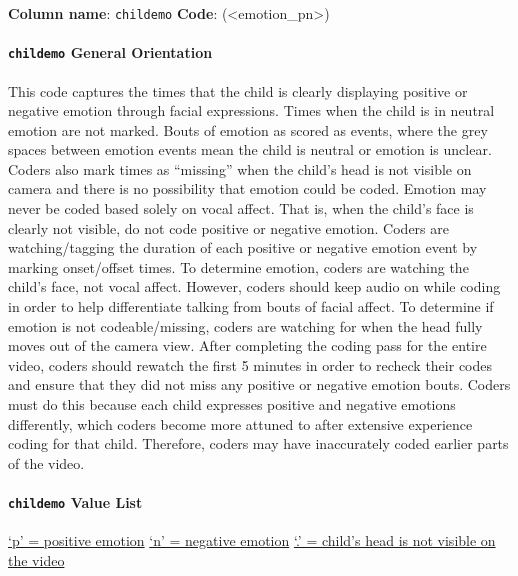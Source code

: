\documentclass[
]{book}
\begin{document}
\textbf{Column name}: \texttt{childemo}
\textbf{Code}: (\textless emotion\_pn\textgreater)

\hypertarget{childemo-general-orientation}{%
\paragraph*{\texorpdfstring{\texttt{childemo} General Orientation}{childemo General Orientation}}\label{childemo-general-orientation}}

This code captures the times that the child is clearly displaying positive or negative emotion through facial expressions. Times when the child is in neutral emotion are not marked. Bouts of emotion as scored as events, where the grey spaces between emotion events mean the child is neutral or emotion is unclear. Coders also mark times as ``missing'' when the child's head is not visible on camera and there is no possibility that emotion could be coded. Emotion may never be coded based solely on vocal affect. That is, when the child's face is clearly not visible, do not code positive or negative emotion.
Coders are watching/tagging the duration of each positive or negative emotion event by marking onset/offset times. To determine emotion, coders are watching the child's face, not vocal affect. However, coders should keep audio on while coding in order to help differentiate talking from bouts of facial affect. To determine if emotion is not codeable/missing, coders are watching for when the head fully moves out of the camera view.
After completing the coding pass for the entire video, coders should rewatch the first 5 minutes in order to recheck their codes and ensure that they did not miss any positive or negative emotion bouts. Coders must do this because each child expresses positive and negative emotions differently, which coders become more attuned to after extensive experience coding for that child. Therefore, coders may have inaccurately coded earlier parts of the video.

\hypertarget{childemo-value-list}{%
\paragraph*{\texorpdfstring{\texttt{childemo} Value List}{childemo Value List}}\label{childemo-value-list}}

\protect\hyperlink{child_pos_emo}{`p' = positive emotion}
\protect\hyperlink{child_neg_emo}{`n' = negative emotion}
\protect\hyperlink{child_head_not_visible}{`.' = child's head is not visible on the video}
\end{document}
